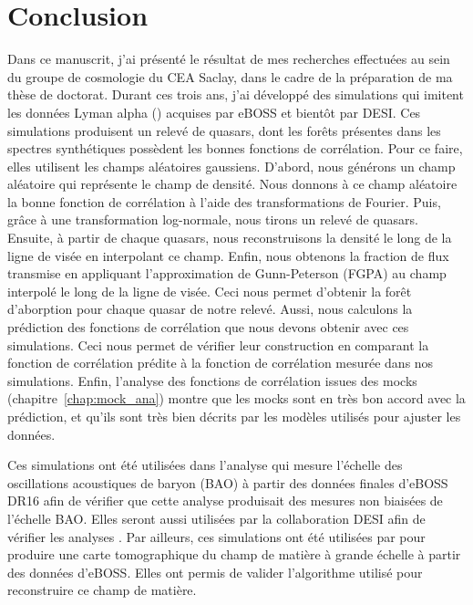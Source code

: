 % 

% 




\chapter{Conclusion}
\thispagestyle{fancy}

Dans ce manuscrit, j'ai présenté le résultat de mes recherches effectuées au sein du groupe de cosmologie du CEA Saclay, dans le cadre de la préparation de ma thèse de doctorat.
Durant ces trois ans, j'ai développé des simulations qui imitent les données Lyman alpha (\lya{}) acquises par eBOSS et bientôt par DESI.
Ces simulations produisent un relevé de quasars, dont les forêts \lya{} présentes dans les spectres synthétiques possèdent les bonnes fonctions de corrélation.
Pour ce faire, elles utilisent les champs aléatoires gaussiens. D'abord, nous générons un champ aléatoire qui représente le champ de densité. Nous donnons à ce champ aléatoire la bonne fonction de corrélation à l'aide des transformations de Fourier.
Puis, grâce à une transformation log-normale, nous tirons un relevé de quasars. Ensuite, à partir de chaque quasars, nous reconstruisons la densité le long de la ligne de visée en interpolant ce champ. Enfin, nous obtenons la fraction de flux transmise en appliquant l'approximation de Gunn-Peterson (FGPA) au champ interpolé le long de la ligne de visée.
Ceci nous permet d'obtenir la forêt d'aborption \lya{} pour chaque quasar de notre relevé.
Aussi, nous calculons la prédiction des fonctions de corrélation que nous devons obtenir avec ces simulations. Ceci nous permet de vérifier leur construction en comparant la fonction de corrélation prédite à la fonction de corrélation mesurée dans nos simulations.
Enfin, l'analyse des fonctions de corrélation issues des mocks (chapitre~\ref{chap:mock_ana}) montre que les mocks sont en très bon accord avec la prédiction, et qu'ils sont très bien décrits par les modèles utilisés pour ajuster les données.


Ces simulations ont été utilisées dans l'analyse qui mesure l'échelle des oscillations acoustiques de baryon (BAO) à partir des données finales d'eBOSS DR16 \autocite{DuMasdesBourboux2020} afin de vérifier que cette analyse produisait des mesures non biaisées de l'échelle BAO. Elles seront aussi utilisées par la collaboration DESI afin de vérifier les analyses \lya{}.
Par ailleurs, ces simulations ont été utilisées par \textcite{Ravoux2020} pour produire une carte tomographique du champ de matière à grande échelle à partir des données d'eBOSS. Elles ont permis de valider l'algorithme utilisé pour reconstruire ce champ de matière.

